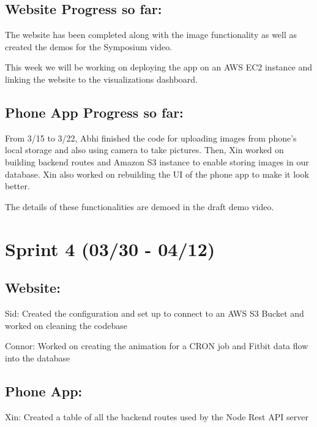 \documentclass[]{book}
\begin{document}
\hypertarget{website-progress-so-far}{%
\subsection{Website Progress so far:}\label{website-progress-so-far}}

The website has been completed along with the image functionality as well as created the demos for the Symposium video.

This week we will be working on deploying the app on an AWS EC2 instance and linking the website to the visualizations dashboard.

\hypertarget{phone-app-progress-so-far-1}{%
\subsection{Phone App Progress so far:}\label{phone-app-progress-so-far-1}}

From 3/15 to 3/22, Abhi finished the code for uploading images from phone's local storage and also using camera to take pictures. Then, Xin worked on building backend routes and Amazon S3 instance to enable storing images in our database. Xin also worked on rebuilding the UI of the phone app to make it look better.

The details of these functionalities are demoed in the draft demo video.

\hypertarget{sprint-4-0330---0412}{%
\section{Sprint 4 (03/30 - 04/12)}\label{sprint-4-0330---0412}}

\hypertarget{website-1}{%
\subsection{Website:}\label{website-1}}

Sid: Created the configuration and set up to connect to an AWS S3 Bucket and worked on cleaning the codebase

Connor: Worked on creating the animation for a CRON job and Fitbit data flow into the database

\hypertarget{phone-app-1}{%
\subsection{Phone App:}\label{phone-app-1}}

Xin: Created a table of all the backend routes used by the Node Rest API server
\end{document}
